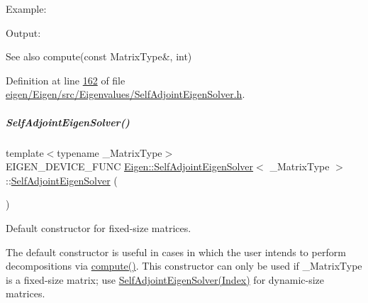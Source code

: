 Example\+: 
\begin{DoxyCodeInclude}
\end{DoxyCodeInclude}
 Output\+: 
\begin{DoxyVerbInclude}
\end{DoxyVerbInclude}


\begin{DoxySeeAlso}{See also}
compute(const Matrix\+Type\&, int) 
\end{DoxySeeAlso}


Definition at line \hyperlink{eigen_2_eigen_2src_2_eigenvalues_2_self_adjoint_eigen_solver_8h_source_l00162}{162} of file \hyperlink{eigen_2_eigen_2src_2_eigenvalues_2_self_adjoint_eigen_solver_8h_source}{eigen/\+Eigen/src/\+Eigenvalues/\+Self\+Adjoint\+Eigen\+Solver.\+h}.

\mbox{\label{group___eigenvalues___module_af3466b3809be4a7738d84493d80d4737}} 
\subparagraph{\texorpdfstring{Self\+Adjoint\+Eigen\+Solver()}{SelfAdjointEigenSolver()}\hspace{0.1cm}{\footnotesize\ttfamily [4/6]}}
{\footnotesize\ttfamily template$<$typename \+\_\+\+Matrix\+Type$>$ \\
E\+I\+G\+E\+N\+\_\+\+D\+E\+V\+I\+C\+E\+\_\+\+F\+U\+NC \hyperlink{group___eigenvalues___module_class_eigen_1_1_self_adjoint_eigen_solver}{Eigen\+::\+Self\+Adjoint\+Eigen\+Solver}$<$ \+\_\+\+Matrix\+Type $>$\+::\hyperlink{group___eigenvalues___module_class_eigen_1_1_self_adjoint_eigen_solver}{Self\+Adjoint\+Eigen\+Solver} (\begin{DoxyParamCaption}{ }\end{DoxyParamCaption})\hspace{0.3cm}{\ttfamily [inline]}}



Default constructor for fixed-\/size matrices. 

The default constructor is useful in cases in which the user intends to perform decompositions via \hyperlink{group___eigenvalues___module_a88bcdc24112efa7c4d2ebb3476efcbe9}{compute()}. This constructor can only be used if {\ttfamily \+\_\+\+Matrix\+Type} is a fixed-\/size matrix; use \hyperlink{group___eigenvalues___module_af20f466a4c29477271e91841e3382b27}{Self\+Adjoint\+Eigen\+Solver(\+Index)} for dynamic-\/size matrices.

